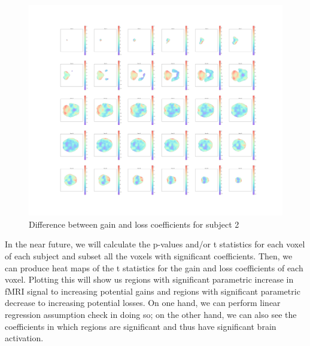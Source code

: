 \begin{figure}[H]
    \centering
        \includegraphics[scale=0.5]{figures/sub2diff_heatmap.png}
    \caption{Difference between gain and loss coefficients for subject 2}
\end{figure}

In the near future, we will calculate the p-values and/or t statistics for 
each voxel of each subject and subset all the voxels with significant 
coefficients. Then, we can produce heat maps of the t statistics for the gain 
and loss coefficients of each voxel. Plotting this will show us regions with 
significant parametric increase in fMRI signal to increasing potential gains 
and regions with significant parametric decrease to increasing potential 
losses. On one hand, we can perform linear regression assumption check in 
doing so; on the other hand, we can also see the coefficients in which regions 
are significant and thus have significant brain activation.



